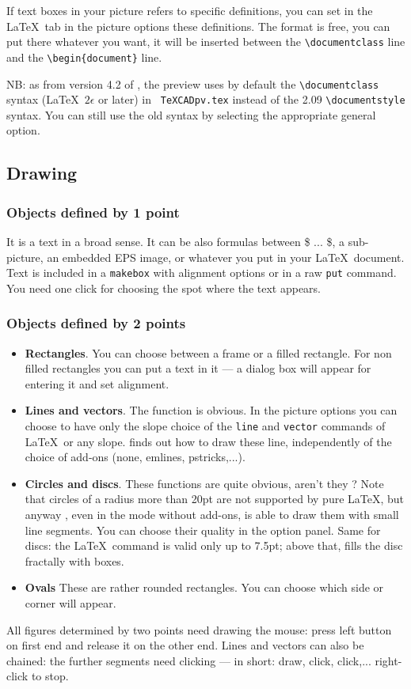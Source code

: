 \documentclass[11pt,a4paper]{article}
\begin{document}
If text boxes in your picture refers to specific definitions, you
can set in the \LaTeX \, tab in the picture options these
definitions. The format is free, you can put there whatever you
want, it will be inserted between the \verb+\documentclass+ line
and the \verb+\begin{document}+ line.

NB: as from version 4.2 of \TC, the preview uses by default the
\verb+\documentclass+ syntax (\LaTeX\, $2\epsilon$ or later) in {\tt
TeXCADpv.tex} instead of the 2.09 \verb+\documentstyle+ syntax.
You can still use the old syntax by selecting the appropriate
general option.

\subsection{Drawing}
\subsubsection{Objects defined by 1 point}
It is a text in a broad sense. It can be also formulas between \$ ...
\$, a sub-picture, an embedded EPS image, or whatever you put in
your \LaTeX\, document. Text is included in a {\tt \bs makebox}
with alignment options or in a raw {\tt \bs put} command.
You need one click for choosing the spot where the text appears.
%
\subsubsection{Objects defined by 2 points}
\begin{itemize}
\item {\bf Rectangles}. You can choose between a frame
or a filled rectangle. For non filled rectangles you can put a
text in it --- a dialog box will appear for entering it and set
alignment.
\item {\bf Lines and vectors}. The function is obvious. In the
picture options you can choose to have only the slope choice of
the {\tt \bs line} and {\tt \bs vector} commands of \LaTeX\, or
any slope. {\TC} finds out how to draw these line, independently
of the choice of add-ons (none, emlines, pstricks,...).
\item {\bf Circles and discs}. These functions are quite obvious,
aren't they ? Note that circles of a radius more than 20pt are
not supported by pure \LaTeX, but anyway {\TC}, even in the mode
without add-ons, is able to draw them with small line segments. You
can choose their quality in the option panel. Same for discs: the \LaTeX\,
command is valid only up to 7.5pt; above that, {\TC} fills the disc
fractally with boxes.
\item {\bf Ovals} These are rather rounded rectangles. You can
choose which side or corner will appear.
\end{itemize}
%
All figures determined by two points need drawing the mouse:
press left button on first end and release it on the other end.
Lines and vectors can also be chained: the further segments need clicking
--- in short: draw, click, click,... right-click to stop.
%
\end{document}
